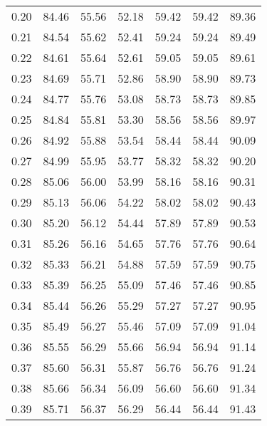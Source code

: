 \begin{tabular}{|c|c|c|c|c|c|c|}
      0.20 &     84.46 &     55.56 &      52.18 &   59.42 &      59.42 &         89.36 \\
      0.21 &     84.54 &     55.62 &      52.41 &   59.24 &      59.24 &         89.49 \\
      0.22 &     84.61 &     55.64 &      52.61 &   59.05 &      59.05 &         89.61 \\
      0.23 &     84.69 &     55.71 &      52.86 &   58.90 &      58.90 &         89.73 \\
      0.24 &     84.77 &     55.76 &      53.08 &   58.73 &      58.73 &         89.85 \\
      0.25 &     84.84 &     55.81 &      53.30 &   58.56 &      58.56 &         89.97 \\
      0.26 &     84.92 &     55.88 &      53.54 &   58.44 &      58.44 &         90.09 \\
      0.27 &     84.99 &     55.95 &      53.77 &   58.32 &      58.32 &         90.20 \\
      0.28 &     85.06 &     56.00 &      53.99 &   58.16 &      58.16 &         90.31 \\
      0.29 &     85.13 &     56.06 &      54.22 &   58.02 &      58.02 &         90.43 \\
      0.30 &     85.20 &     56.12 &      54.44 &   57.89 &      57.89 &         90.53 \\
      0.31 &     85.26 &     56.16 &      54.65 &   57.76 &      57.76 &         90.64 \\
      0.32 &     85.33 &     56.21 &      54.88 &   57.59 &      57.59 &         90.75 \\
      0.33 &     85.39 &     56.25 &      55.09 &   57.46 &      57.46 &         90.85 \\
      0.34 &     85.44 &     56.26 &      55.29 &   57.27 &      57.27 &         90.95 \\
      0.35 &     85.49 &     56.27 &      55.46 &   57.09 &      57.09 &         91.04 \\
      0.36 &     85.55 &     56.29 &      55.66 &   56.94 &      56.94 &         91.14 \\
      0.37 &     85.60 &     56.31 &      55.87 &   56.76 &      56.76 &         91.24 \\
      0.38 &     85.66 &     56.34 &      56.09 &   56.60 &      56.60 &         91.34 \\
      0.39 &     85.71 &     56.37 &      56.29 &   56.44 &      56.44 &         91.43 \\

\end{tabular}
